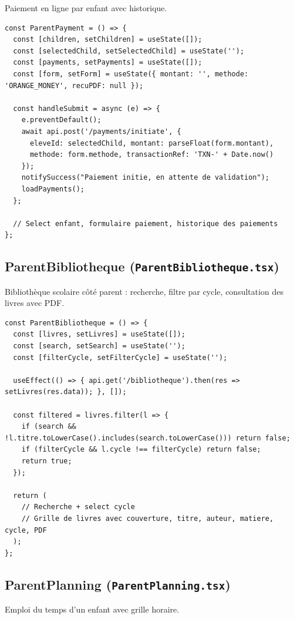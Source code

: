 \documentclass[12pt,a4paper]{article}
\begin{document}
Paiement en ligne par enfant avec historique.

\begin{lstlisting}[style=code]
const ParentPayment = () => {
  const [children, setChildren] = useState([]);
  const [selectedChild, setSelectedChild] = useState('');
  const [payments, setPayments] = useState([]);
  const [form, setForm] = useState({ montant: '', methode: 'ORANGE_MONEY', recuPDF: null });

  const handleSubmit = async (e) => {
    e.preventDefault();
    await api.post('/payments/initiate', {
      eleveId: selectedChild, montant: parseFloat(form.montant),
      methode: form.methode, transactionRef: 'TXN-' + Date.now()
    });
    notifySuccess("Paiement initie, en attente de validation");
    loadPayments();
  };

  // Select enfant, formulaire paiement, historique des paiements
};
\end{lstlisting}

\subsection{ParentBibliotheque (\texttt{ParentBibliotheque.tsx})}

Bibliothèque scolaire côté parent : recherche, filtre par cycle, consultation des livres avec PDF.

\begin{lstlisting}[style=code]
const ParentBibliotheque = () => {
  const [livres, setLivres] = useState([]);
  const [search, setSearch] = useState('');
  const [filterCycle, setFilterCycle] = useState('');

  useEffect(() => { api.get('/bibliotheque').then(res => setLivres(res.data)); }, []);

  const filtered = livres.filter(l => {
    if (search && !l.titre.toLowerCase().includes(search.toLowerCase())) return false;
    if (filterCycle && l.cycle !== filterCycle) return false;
    return true;
  });

  return (
    // Recherche + select cycle
    // Grille de livres avec couverture, titre, auteur, matiere, cycle, PDF
  );
};
\end{lstlisting}

\subsection{ParentPlanning (\texttt{ParentPlanning.tsx})}

Emploi du temps d'un enfant avec grille horaire.
\end{document}
